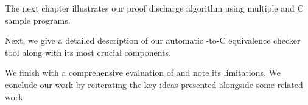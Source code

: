The next chapter illustrates our proof discharge algorithm using multiple \SpecL{} and C
sample programs.

Next, we give a detailed description of our automatic \SpecL{}-to-C equivalence checker tool \toolName{}
along with its most crucial components.

We finish with a comprehensive evaluation of \toolName{} and note its limitations.
We conclude our work by reiterating the key ideas presented alongside some related work.